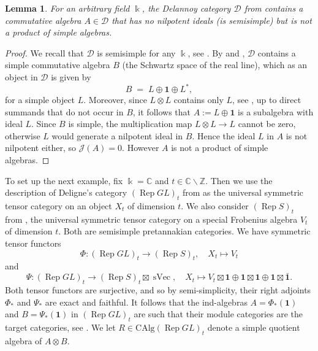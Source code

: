 \documentclass[11pt]{amsart}
\def\Ds{\mathscr{D}}
\def\bk{\Bbbk}
\def\mZ{\mathbb{Z}}
\def\Rep{\operatorname{Rep}}
\def\sVec{\operatorname{sVec}}
\newtheorem{lemma}[thm]{Lemma}
\theoremstyle{definition}
\theoremstyle{remark}
\numberwithin{equation}{section}
\newcommand{\unit}{\mathbf{1}}
\newcommand{\CAlg}{\mathrm{CAlg}}
\begin{document}
\begin{lemma}\label{lem:Dela}
    For an arbitrary field $\bk$, the Delannoy category $\Ds$ from \cite{HSS} contains a commutative algebra $A\in\Ds$ that has no nilpotent ideals (is semisimple) but is not a product of simple algebras. 
\end{lemma}
\begin{proof} We recall that $\Ds$ is semisimple for any $\bk$, see \cite{HSS}.
By \cite[Theorem~4.7]{HSS} and \cite[4.10, 4.11 and~5.2(b)]{HS}, $\Ds$ contains a simple commutative algebra $B$ (the Schwartz space of the real line), which as an object in $\Ds$ is given by
\[B\;=\; L\oplus \unit\oplus L^\ast,\]
for a simple object $L$. Moreover, since $L\otimes L$ contains only $L$, see \cite[Proposition~7.5]{HSS}, up to direct summands that do not occur in $B$, it follows that $A:=L\oplus \unit$ is a subalgebra with ideal $L$. Since $B$ is simple, the multiplication map $L\otimes L\to L$ cannot be zero, otherwise $L$ would generate a nilpotent ideal in $B$. Hence the ideal $L$ in $A$ is not nilpotent either, so $\mathcal{J}(A)=0$.  However $A$ is not a product of simple algebras.
\end{proof}


To set up the next example, fix $\bk=\mathbb{C}$ and $t\in\mathbb{C}\backslash\mZ$. Then we use the description of Deligne's category $(\Rep GL)_t$ from \cite[\S 10]{Del07} as the universal symmetric tensor category on an object $X_t$ of dimension $t$. We also consider $(\Rep S)_t$ from \cite{Del07}, the universal symmetric tensor category on a special Frobenius algebra $V_t$ of dimension $t$. Both are semisimple pretannakian categories. We have symmetric tensor functors
$$\Phi:(\Rep GL)_t\to(\Rep S)_t,\quad X_t\mapsto V_t$$
and
$$\Psi:(\Rep GL)_t\to(\Rep S)_t\boxtimes \sVec,\quad X_t\mapsto V_t\boxtimes\unit\oplus \unit\boxtimes\unit\oplus \unit\boxtimes \bar{\unit}.$$
Both tensor functors are surjective, and so by semi-simplicity, their right adjoints $\Phi_\ast$ and $\Psi_\ast$ are exact and faithful. It follows that the ind-algebras $A=\Phi_\ast(\unit)$ and $B=\Psi_\ast(\unit)$ in $(\Rep GL)_t$ are such that their module categories are the target categories, see \cite[Lemma~6.2.1]{CEO}. We let $R\in\CAlg(\Rep GL)_t$ denote a simple quotient algebra of $A\otimes B$.
\end{document}
